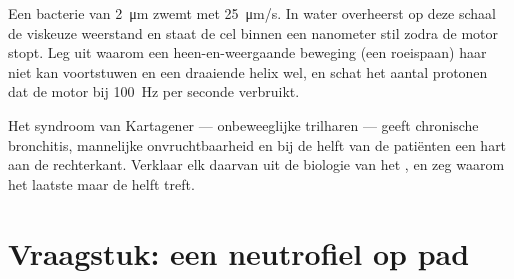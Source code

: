 \begin{exercise}[$\star\star\star$]\label{exo:b3:cytoskeleton-motility:11}
Een bacterie van \qty{2}{\micro m} zwemt met \qty{25}{\micro m/s}. In
water overheerst op deze schaal de viskeuze weerstand en staat de cel
binnen een nanometer stil zodra de motor stopt. Leg uit waarom een
heen-en-weergaande beweging (een roeispaan) haar niet kan voortstuwen en
een draaiende helix wel, en schat het aantal protonen dat de motor bij
\qty{100}{Hz} per seconde verbruikt.
\end{exercise}

\begin{exercise}[$\star\star\star$]\label{exo:b3:cytoskeleton-motility:12}
Het syndroom van Kartagener --- onbeweeglijke trilharen --- geeft
chronische bronchitis, mannelijke onvruchtbaarheid en bij de helft van
de patiënten een hart aan de rechterkant. Verklaar elk daarvan uit de
biologie van het , en zeg waarom het laatste maar de helft
treft.
\end{exercise}

\section{Vraagstuk: een neutrofiel op pad}

